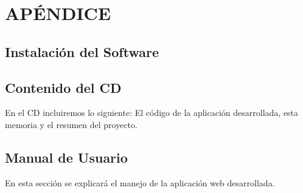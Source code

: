 \documentclass[12pt, a4paper, twoside]{book}
\begin{document}
	\appendix
	\chapter{APÉNDICE}
	\section{Instalación del Software}

	
	\section{Contenido del CD}
	En el CD incluiremos lo siguiente: El código de la aplicación desarrollada, esta memoria y el resumen del proyecto.
	\section{Manual de Usuario}
	En esta sección se explicará el manejo de la aplicación web desarrollada.
		
	
\end{document}
